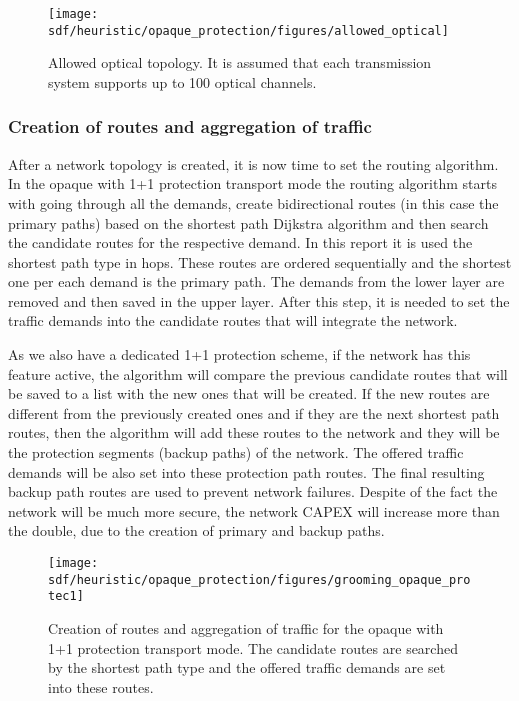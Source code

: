 \begin{figure}[H]
\centering
\texttt{[image: sdf/heuristic/opaque\_protection/figures/allowed\_optical]}
\caption{Allowed optical topology. It is assumed that each transmission system supports up to 100 optical channels.}
\label{allowed_optical_protec}
\end{figure}

\subsubsection{Creation of routes and aggregation of traffic}

\vspace{11pt}
After a network topology is created, it is now time to set the routing algorithm. In the opaque with 1+1 protection transport mode the routing algorithm starts with going through all the demands, create bidirectional routes (in this case the primary paths) based on the shortest path Dijkstra algorithm and then search the candidate routes for the respective demand. In this report it is used the shortest path type in hops. These routes are ordered sequentially and the shortest one per each demand is the primary path. The demands from the lower layer are removed and then saved in the upper layer. After this step, it is needed to set the traffic demands into the candidate routes that will integrate the network.

As we also have a dedicated 1+1 protection scheme, if the network has this feature active, the algorithm will compare the previous candidate routes that will be saved to a list with the new ones that will be created. If the new routes are different from the previously created ones and if they are the next shortest path routes, then the algorithm will add these routes to the network and they will be the protection segments (backup paths) of the network. The offered traffic demands will be also set into these protection path routes. The final resulting backup path routes are used to prevent network failures. Despite of the fact the network will be much more secure, the network CAPEX will increase more than the double, due to the creation of primary and backup paths.

\begin{figure}[H]
\centering
\texttt{[image: sdf/heuristic/opaque\_protection/figures/grooming\_opaque\_protec1]}
\caption{Creation of routes and aggregation of traffic for the opaque with 1+1 protection transport mode. The candidate routes are searched by the shortest path type and the offered traffic demands are set into these routes.}
\label{grooming_opaque_protec1}
\end{figure}

